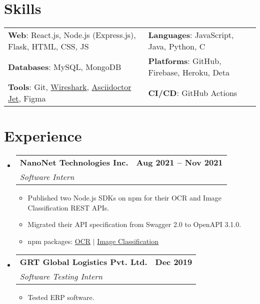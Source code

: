 \documentclass[letterpaper,11pt]{article}
\makeatletter
\newcommand{\resumeItem}[1]{
  \item\small{
    {#1 \vspace{-2pt}}
  }
}
\newcommand{\resumeSubheading}[4]{
  \vspace{-2pt}\item
    \begin{tabular*}{1.0\textwidth}[t]{l@{\extracolsep{\fill}}r}
      \vspace{-2pt}\textbf{#1} & \textbf{\small #2} \\
      \textit{\small#3} & \textit{\small #4} \\
    \end{tabular*}\vspace{-7pt}
}
\newcommand{\resumeSubHeadingListStart}{\begin{itemize}[leftmargin=0.0in, label={}]}
\newcommand{\resumeSubHeadingListEnd}{\end{itemize}}
\newcommand{\resumeItemListStart}{\begin{itemize}}
\newcommand{\resumeItemListEnd}{\end{itemize}\vspace{-5pt}}
\makeatother
\begin{document}
\section{Skills}
    \vspace{-4pt}
    \begin{itemize}[leftmargin=0.2in, label={}]
        {\item{
            \begin{tabular}{ l@{\hskip 0.2in} l }
                 \textbf{Web}: React.js, Node.js (Express.js), Flask, HTML, CSS, JS & \textbf{Languages}: JavaScript, Java, Python, C \\ 
                 \textbf{Databases}: MySQL, MongoDB & \textbf{Platforms}: GitHub, Firebase, Heroku, Deta \\  
                 \textbf{Tools}: Git, \href{https://networking.harshkapadia.me}{Wireshark}, \href{https://harshkapadia2.github.io/asciidoctor-jet}{Asciidoctor Jet}, Figma & \textbf{CI/CD}: GitHub Actions
            \end{tabular}
        }}
    \end{itemize}
\vspace{-22pt}


\section{Experience}
    \vspace{-2pt}
    \resumeSubHeadingListStart
        \resumeSubheading
            {NanoNet Technologies Inc.}{Aug 2021 -- Nov 2021}
            {Software Intern}{}
            \resumeItemListStart
                \resumeItem{Published two Node.js SDKs on npm for their OCR and Image Classification REST APIs.}
                \resumeItem{Migrated their API specification from Swagger 2.0 to OpenAPI 3.1.0.}
                \resumeItem{npm packages: \href{https://www.npmjs.com/package/@nanonets/optical-character-recognition}{OCR} $|$  \href{https://www.npmjs.com/package/@nanonets/image-classification}{Image Classification}}
            \resumeItemListEnd
        \vspace{-3pt}

        \resumeSubheading
            {GRT Global Logistics Pvt. Ltd.}{Dec 2019}
            {Software Testing Intern}{}
            \resumeItemListStart
                \resumeItem{Tested ERP software.}
            \resumeItemListEnd
    \resumeSubHeadingListEnd
\vspace{-19pt}
\end{document}
